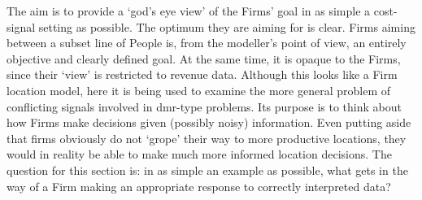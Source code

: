 The aim is to provide a `god's eye view' of the Firms' goal in as simple a cost-signal setting as possible. The optimum they are aiming for is clear. Firms aiming between a subset line of People is, from the modeller's point of view, an entirely objective and clearly defined goal. At the same time, it is opaque to the Firms, since their `view' is restricted to revenue data. Although this looks like a Firm location model, here it is being used to examine the more general problem of conflicting signals involved in \gls{dmr}-type problems. Its purpose is to think about how Firms make decisions given (possibly noisy) information. Even putting aside that firms obviously do not `grope' their way to more productive locations, they would in reality be able to make much more informed location decisions. The question for this section is: in as simple an example as possible, what gets in the way of a Firm making an appropriate response to correctly interpreted data?




